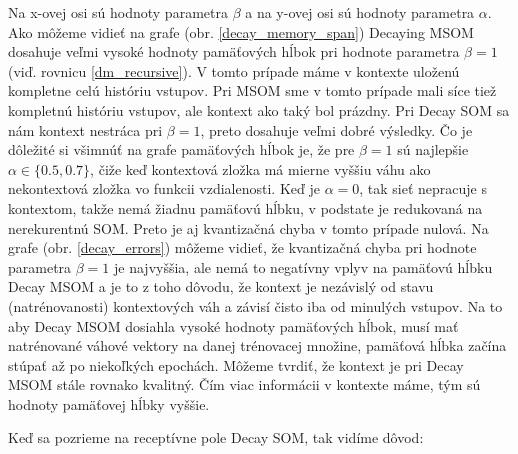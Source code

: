     
Na x-ovej osi sú hodnoty parametra $\beta$ a na y-ovej osi sú hodnoty parametra $\alpha$.
Ako môžeme vidieť na grafe (obr. \ref{decay_memory_span}) Decaying MSOM dosahuje veľmi vysoké hodnoty pamäťových hĺbok pri hodnote 
parametra $\beta = 1$ (viď. rovnicu \ref{dm_recursive}). V tomto prípade máme v kontexte uloženú kompletne celú históriu vstupov. Pri MSOM sme v tomto prípade mali síce tiež kompletnú históriu vstupov, ale kontext ako taký bol prázdny.
Pri Decay SOM sa nám kontext nestráca pri $\beta = 1$, preto dosahuje veľmi dobré výsledky.
Čo je dôležité si všimnúť na grafe pamäťových hĺbok je, že pre $\beta = 1$ sú najlepšie $\alpha \in \lbrace 0.5, 0.7 \rbrace$, čiže keď kontextová zložka má mierne vyššiu váhu ako nekontextová zložka vo funkcii vzdialenosti. 
Keď je $\alpha = 0$, tak sieť nepracuje s kontextom, takže nemá žiadnu pamäťovú hĺbku,
v podstate je redukovaná na nerekurentnú SOM. Preto je aj kvantizačná chyba v tomto prípade nulová.
Na grafe (obr. \ref{decay_errors}) môžeme vidieť, že kvantizačná chyba pri hodnote parametra $\beta = 1$ je najvyššia, ale nemá to negatívny 
vplyv na pamäťovú hĺbku Decay MSOM a je to z toho dôvodu, že kontext je nezávislý od stavu (natrénovanosti) kontextových váh a závisí čisto iba od minulých vstupov.
Na to aby Decay MSOM dosiahla vysoké hodnoty pamäťových hĺbok, musí mať natrénované váhové vektory na danej trénovacej množine, pamäťová hĺbka začína stúpať až
po niekoľkých epochách.
Môžeme tvrdiť, že kontext je pri Decay MSOM stále rovnako kvalitný. Čím viac informácii v kontexte máme, tým sú hodnoty pamäťovej hĺbky vyššie.

Keď sa pozrieme na receptívne pole Decay SOM, tak vidíme dôvod:

